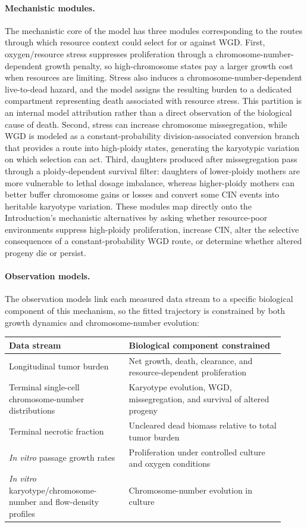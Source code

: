 \documentclass[11pt]{article}
\begin{document}
\paragraph{Mechanistic modules.}
The mechanistic core of the model has three modules corresponding to the routes through which resource context could select for or against WGD. First, oxygen/resource stress suppresses proliferation through a chromosome-number-dependent growth penalty, so high-chromosome states pay a larger growth cost when resources are limiting. Stress also induces a chromosome-number-dependent live-to-dead hazard, and the model assigns the resulting burden to a dedicated compartment representing death associated with resource stress. This partition is an internal model attribution rather than a direct observation of the biological cause of death. Second, stress can increase chromosome missegregation, while WGD is modeled as a constant-probability division-associated conversion branch that provides a route into high-ploidy states, generating the karyotypic variation on which selection can act. Third, daughters produced after missegregation pass through a ploidy-dependent survival filter: daughters of lower-ploidy mothers are more vulnerable to lethal dosage imbalance, whereas higher-ploidy mothers can better buffer chromosome gains or losses and convert some CIN events into heritable karyotype variation. These modules map directly onto the Introduction's mechanistic alternatives by asking whether resource-poor environments suppress high-ploidy proliferation, increase CIN, alter the selective consequences of a constant-probability WGD route, or determine whether altered progeny die or persist.

\paragraph{Observation models.}
The observation models link each measured data stream to a specific biological component of this mechanism, so the fitted trajectory is constrained by both growth dynamics and chromosome-number evolution:

\begin{center}
\begin{tabular}{p{0.40\linewidth}p{0.52\linewidth}}
\toprule
\textbf{Data stream} & \textbf{Biological component constrained} \\
\midrule
Longitudinal tumor burden & Net growth, death, clearance, and resource-dependent proliferation \\
Terminal single-cell chromosome-number distributions & Karyotype evolution, WGD, missegregation, and survival of altered progeny \\
Terminal necrotic fraction & Uncleared dead biomass relative to total tumor burden \\
\textit{In vitro} passage growth rates & Proliferation under controlled culture and oxygen conditions \\
\textit{In vitro} karyotype/chromosome-number and flow-density profiles & Chromosome-number evolution in culture \\
\bottomrule
\end{tabular}
\end{center}
\end{document}
